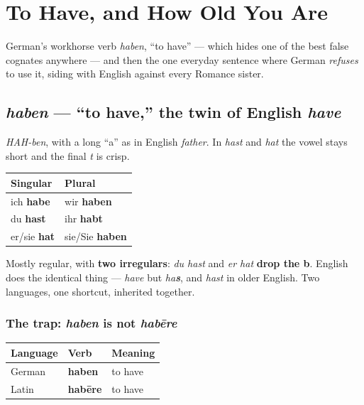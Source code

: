 \chapter{To Have, and How Old You Are}
\label{ch:haben-alter}

German's workhorse verb \emph{haben}, ``to have'' --- which hides one of the best false
cognates anywhere --- and then the one everyday sentence where German
\emph{refuses} to use it, siding with English against every Romance sister.

\section{\emph{haben} --- ``to have,'' the twin of English \emph{have}}
\label{lesson:haben}

\begin{sounds}
\emph{HAH-ben}, with a long ``a'' as in English \emph{father}. In \emph{hast}
and \emph{hat} the vowel stays short and the final \emph{t} is crisp.
\end{sounds}

\begin{center}
\begin{tabular}{@{}ll@{}}
\toprule
Singular & Plural \\
\midrule
ich \textbf{habe} & wir \textbf{haben} \\
du \textbf{hast} & ihr \textbf{habt} \\
er/sie \textbf{hat} & sie/Sie \textbf{haben} \\
\bottomrule
\end{tabular}
\end{center}

\begin{morphologybox}
Mostly regular, with \textbf{two irregulars}: \emph{du hast} and \emph{er hat}
\textbf{drop the b}. English does the identical thing --- \emph{have} but
\emph{ha\textbf{s}}, and \emph{hast} in older English. Two languages, one
shortcut, inherited together.
\end{morphologybox}

\subsection*{The trap: \emph{haben} is not \emph{hab\=ere}}

\begin{center}
\begin{tabular}{@{}lll@{}}
\toprule
Language & Verb & Meaning \\
\midrule
German & \textbf{haben} & to have \\
Latin & \textbf{hab\=ere} & to have \\
\bottomrule
\end{tabular}
\end{center}

